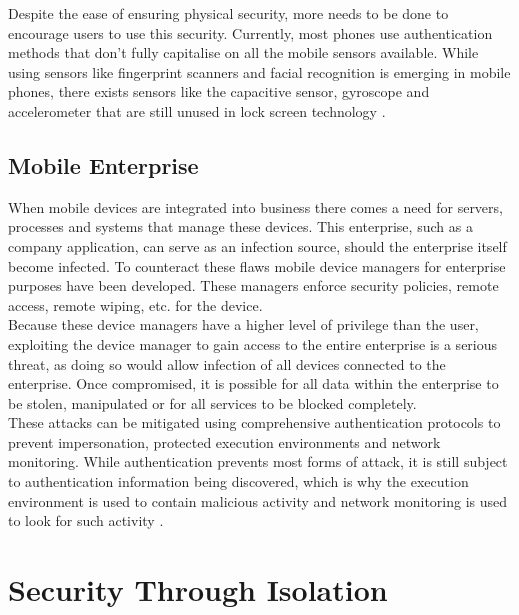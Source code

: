 Despite the ease of ensuring physical security, more needs to be done to encourage users to use this security.
Currently, most phones use authentication methods that don’t fully capitalise on all the mobile sensors available.
While using sensors like fingerprint scanners and facial recognition is emerging in mobile phones, there exists sensors like the capacitive sensor, gyroscope and accelerometer that are still unused in lock screen technology \cite{Reference13}.


\subsection{Mobile Enterprise}

\label{Ch2 Sec2 Sub5}

When mobile devices are integrated into business there comes a need for servers, processes and systems that manage these devices.
This enterprise, such as a company application, can serve as an infection source, should the enterprise itself become infected.
To counteract these flaws mobile device managers for enterprise purposes have been developed.
These managers enforce security policies, remote access, remote wiping, etc. for the device.\\
Because these device managers have a higher level of privilege than the user, exploiting the device manager to gain access to the entire enterprise is a serious threat, as doing so would allow infection of all devices connected to the enterprise.
Once compromised, it is possible for all data within the enterprise to be stolen, manipulated or for all services to be blocked completely.\\
These attacks can be mitigated using comprehensive authentication protocols to prevent impersonation, protected execution environments and network monitoring.
While authentication prevents most forms of attack, it is still subject to authentication information being discovered, which is why the execution environment is used to contain malicious activity and network monitoring is used to look for such activity \cite{Reference13}.


\section{Security Through Isolation}

